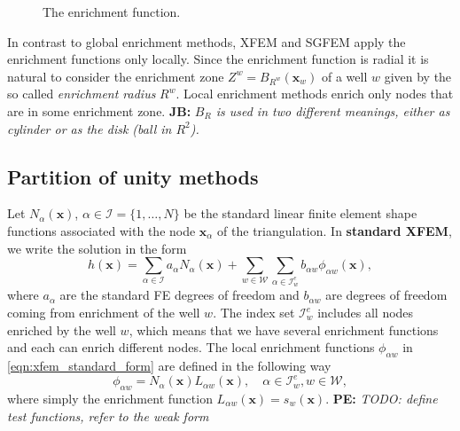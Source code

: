 \documentclass[preprint,12pt]{elsarticle}
\newcommand{\figpath}{../graphics/}
\def\vc#1{\mathbf{\boldsymbol{#1}}}     %
\newcommand{\bx}{\vc{x}}
\newcommand{\noteJB}[1]{{\color{Blue} \textbf{JB: } \textit{#1}}}
\newcommand{\notePE}[1]{{\color{Orange} \textbf{PE: } \textit{#1}}}
\begin{document}
\begin{figure}[!htb]
  \begin{center}         
    \def\svgwidth{0.5\textwidth}
    
  \end{center}
  \caption{The enrichment function.}
  \label{fig:enrich_func}
\end{figure}


In contrast to global enrichment methods, XFEM and SGFEM apply the enrichment functions only locally. Since the enrichment function is radial it is natural
to consider the enrichment zone $Z^w = B_{R^w}(\vc x_w)$ of a well $w$ given by the so called \emph{enrichment radius} $R^w$. Local enrichment methods enrich only 
nodes that are in some enrichment zone.
\noteJB{$B_R$ is used in two different meanings, either as cylinder or as the disk (ball in $R^2$).}

    
\subsection{Partition of unity methods}
\label{sec:pum_methods}
Let $N_\alpha(\bx)$, $\alpha\in\mathcal{I}=\{1,\ldots,N\}$ be the standard linear finite element shape 
functions associated with the node $\bx_\alpha$ of the triangulation. 
In \textbf{standard XFEM}, we write the solution in the form
\begin{equation} \label{eqn:xfem_standard_form}
  h(\bx) = \sum \limits_{\alpha\in\mathcal{I}}a_\alpha N_\alpha(\bx)
    + \sum \limits_{w\in\mathcal{W}} \sum \limits_{\alpha\in\mathcal{I}^e_w} b_{\alpha w} \phi_{\alpha w}(\bx),
\end{equation}
where $a_\alpha$ are the standard FE degrees of freedom and $b_{\alpha w}$ are degrees of freedom coming from
enrichment of the well $w$. The index set $\mathcal{I}^e_w$ includes all nodes enriched by the well $w$, which
means that we have several enrichment functions and each can enrich different nodes.
The local enrichment functions $\phi_{\alpha w}$ in \eqref{eqn:xfem_standard_form} are defined
in the following way
\begin{equation} \label{eqn:xfem_enrich}
    \phi_{\alpha w} = N_\alpha(\bx)L_{\alpha w}(\bx), \quad \alpha\in\mathcal{I}^e_w, w\in\mathcal{W},
\end{equation}
where simply the enrichment function $L_{\alpha w}(\bx) = s_w(\bx)$.
\notePE{TODO: define test functions, refer to the weak form}
\end{document}
